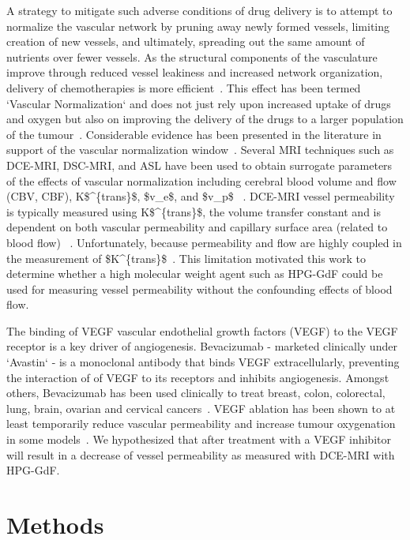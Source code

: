 A strategy to mitigate such adverse conditions of drug delivery is to attempt to normalize the vascular network by pruning away newly formed vessels, limiting creation of new vessels, and ultimately, spreading out the same amount of nutrients over fewer vessels.
As the structural components of the vasculature improve through reduced vessel leakiness and increased network organization, delivery of chemotherapies is more efficient~\cite{Jain:2001uf}.
This effect has been termed `Vascular Normalization` and does not just rely upon increased uptake of drugs and oxygen but also on improving the delivery of the drugs to a larger population of the tumour~\cite{Jain:2005gk}.
Considerable evidence has been presented in the literature in support of the vascular normalization window~\cite{Jain:2005gk,Viallard:2017ck,Martin:2019io}.
Several MRI techniques such as \acs{DCE-MRI}, \acs{DSC-MRI}, and \acs{ASL} have been used to obtain surrogate parameters of the effects of vascular normalization including cerebral blood volume and flow (CBV, CBF), \acs{K$^{trans}$}, \acs{$v_e$}, and \acs{$v_p$} ~.
\acs{DCE-MRI} vessel permeability is typically measured using \acs{K$^{trans}$}, the volume transfer constant and is dependent on both vascular permeability and capillary surface area (related to blood flow) ~\cite{Tofts:1999we}. 
Unfortunately, because permeability and flow are highly coupled in the measurement of \acs{$K^{trans}$}~\cite{Tofts:1999we}.
This limitation motivated this work to determine whether a high molecular weight agent such as \acs{HPG-GdF} could be used for measuring vessel permeability without the confounding effects of blood flow.

The binding of \acs{VEGF} vascular endothelial growth factors (VEGF) to the VEGF receptor is a key driver of angiogenesis.
Bevacizumab - marketed clinically under `Avastin` - is a monoclonal antibody that binds VEGF extracellularly, preventing the interaction of of VEGF to its receptors and inhibits angiogenesis. 
Amongst others, Bevacizumab has been used clinically to treat breast, colon, colorectal, lung, brain, ovarian and cervical cancers~\cite{Genentech:2019th}. 
VEGF ablation has been shown to at least temporarily reduce vascular permeability and increase tumour oxygenation in some models~\cite{OConnor:2012ie}.
We hypothesized that after treatment with a \acs{VEGF} inhibitor will result in a decrease of vessel permeability as measured with \acs{DCE-MRI} with HPG-GdF.


\section{Methods}

